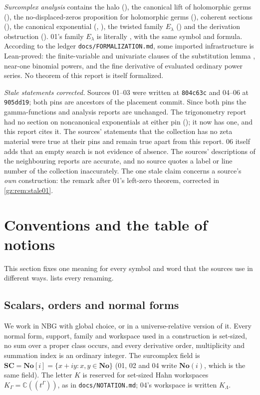 \documentclass[11pt,a4paper]{article}
\numberwithin{equation}{section}
\theoremstyle{definition}
\theoremstyle{remark}
\newcommand{\No}{\mathbf{No}}
\newcommand{\SC}{\mathbf{SC}}
\newcommand{\C}{\mathbb C}
\newcommand{\pinA}{\texttt{804c63c}}
\newcommand{\pinB}{\texttt{905dd19}}
\begin{document}
\emph{Surcomplex analysis} \cite{RAnalysis} contains the halo
(), the canonical lift of holomorphic germs
(), the no-displaced-zeros proposition for holomorphic
germs (), coherent sections
(), the canonical exponential (,
), the twisted family $E_\lambda$ () and the
derivation obstruction (). 01's family
$E_\lambda$ is literally , with the same symbol and
formula. According to the ledger \texttt{docs/FORMALIZATION.md}, some
imported infrastructure is Lean-proved: the finite-variable and univariate
clauses of the substitution lemma , near-one binomial
powers, and the fine derivative of evaluated ordinary power series. No
theorem of this report is itself formalized.

\emph{Stale statements corrected.} Sources 01--03 were written at \pinA{}
and 04--06 at \pinB; both pins are ancestors of the placement commit.
Since both pins the gamma-functions and analysis reports are unchanged. The
trigonometry report had no section on noncanonical exponentials at either
pin (); it now has one, and this report cites it. The
sources' statements that the collection has no zeta material were true at
their pins and remain true apart from this report. 06 itself adds that an
empty search is not evidence of absence. The sources' descriptions of the
neighbouring reports are accurate, and no source quotes a label or line
number of the collection inaccurately. The one stale claim concerns a
source's \emph{own} construction: the remark after 01's left-zero theorem,
corrected in \cref{gz:rem:stale01}.

\section{Conventions and the table of notions}\label{gz:sec:conventions}

This section fixes one meaning for every symbol and word that the sources
use in different ways.  lists every renaming.

\subsection{Scalars, orders and normal forms}\label{gz:sec:scalars}
We work in NBG with global choice, or in a universe-relative version of it.
Every normal form, support, family and workspace used in a construction
is set-sized, no sum over a proper class occurs, and every derivative
order, multiplicity and summation index is an ordinary integer. The
surcomplex field is $\SC=\No[i]=\{x+iy:x,y\in\No\}$ (01, 02 and 04 write
$\No(i)$, which is the same field). The letter $K$ is reserved for set-sized
Hahn workspaces $K_\Gamma=\C((t^\Gamma))$, as in \texttt{docs/NOTATION.md};
04's workspace is written $K_\Lambda$.
\end{document}
